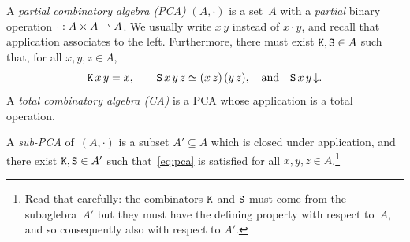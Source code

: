 \begin{definition}
  \label{def:pca}%
  A \emph{partial combinatory algebra (PCA)} $(A, {\cdot})$ is a
  set~$A$ with a
  \emph{partial} binary operation ${\cdot} : A \times A \mathbin{\rightharpoonup} A$. We
  usually write $x\, y$ instead of $x \cdot y$, and recall that
  application associates to the left. Furthermore, there must exist
  $\mathtt{K}, \mathtt{S} \in A$ such that, for all $x, y, z \in A$,
  \begin{equation}
    \label{eq:pca}%
    \combK\, x\, y = x,
    \qquad
    \combS\, x\, y\, z \simeq (x\, z)\,(y\, z),
    \quad\text{and}\quad
    \defined{\combS\, x\, y}.
  \end{equation}
  A \emph{total combinatory algebra (CA)} is a PCA whose application
  is a total operation.

  A \emph{sub-PCA} of~$(A, {\cdot})$ is a subset $A' \subseteq A$
  which is closed under application, and there exist $\mathtt{K}, \mathtt{S}
  \in A'$ such that~\eqref{eq:pca} is satisfied for all $x, y, z \in
  A$.\footnote{Read that carefully: the combinators $\mathtt{K}$ and
    $\mathtt{S}$ must come from the subaglebra~$A'$ but they must have the
    defining property with respect to~$A$, and so consequently also
    with respect to $A'$.}
\end{definition}

